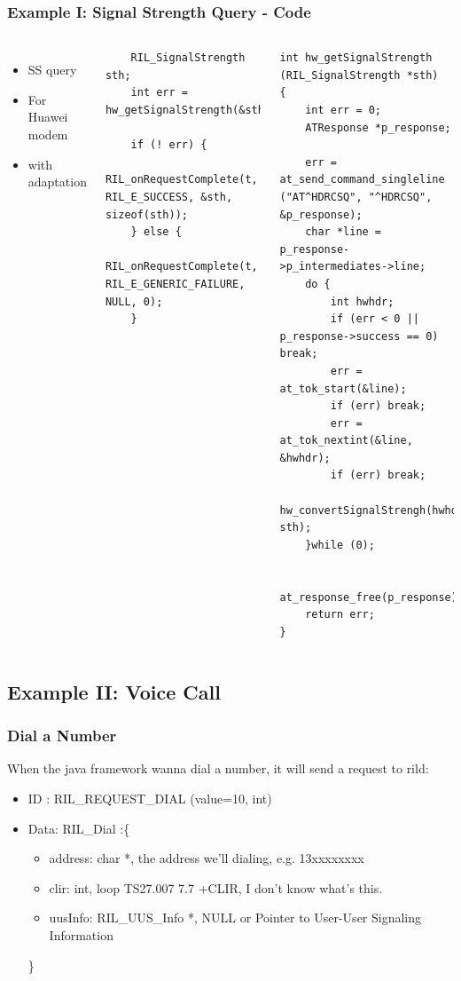 \documentclass{beamer}
\begin{document}
\begin{frame}[fragile]
    \frametitle{Example I: Signal Strength Query - Code}
    \begin{columns}[c]
        \column{1in}
        \begin{itemize}
            \item SS query
            \item For Huawei modem
            \item with adaptation
        \end{itemize}

        \column{3.5in}
    \lstset{language=C}
  \begin{lstlisting}
    RIL_SignalStrength sth;
    int err = hw_getSignalStrength(&sth);

    if (! err) {
        RIL_onRequestComplete(t, RIL_E_SUCCESS, &sth, sizeof(sth));
    } else {
        RIL_onRequestComplete(t, RIL_E_GENERIC_FAILURE, NULL, 0);
    }

  \end{lstlisting}
    \lstset{language=C}
  \begin{lstlisting}
int hw_getSignalStrength (RIL_SignalStrength *sth)
{
    int err = 0;
    ATResponse *p_response;

    err = at_send_command_singleline ("AT^HDRCSQ", "^HDRCSQ", &p_response);
    char *line = p_response->p_intermediates->line;
    do {
        int hwhdr;
        if (err < 0 || p_response->success == 0) break;
        err = at_tok_start(&line);
        if (err) break;
        err = at_tok_nextint(&line, &hwhdr);
        if (err) break;
        hw_convertSignalStrengh(hwhdr, sth);
    }while (0);

    at_response_free(p_response);
    return err;
}
  \end{lstlisting}

    \end{columns}
\end{frame}

\subsection {Example II: Voice Call}
\begin{frame}
    \frametitle{Dial a Number}
    When the java framework wanna dial a number, it will send a request to rild:
    \begin{itemize}
        \item ID  : RIL\_REQUEST\_DIAL (value=10, int)
        \item Data: RIL\_Dial :\{
            \begin{itemize}
                \item address: char *, the address we'll dialing, e.g. 13xxxxxxxx
                \item clir: int, loop TS27.007 7.7 +CLIR, I don't know what's this.
                \item  uusInfo: RIL\_UUS\_Info *, NULL or Pointer to User-User Signaling Information
            \end{itemize}
            \}
    \end{itemize}
\end{frame}
\end{document}
